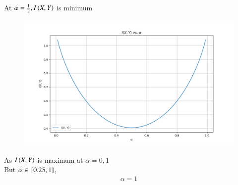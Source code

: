 \documentclass[article]{IEEEtran}
\theoremstyle{remark}
\begin{document}
At $\alpha = \frac{1}{2}, I\left(X,Y\right)$ is minimum\\
\begin{figure}[!ht]
\centering
\includegraphics[width=\columnwidth]{./figs/figure2.png}
\label{Fig:2}
\end{figure}
As $I\left(X,Y\right)$ is maximum at $\alpha = 0,1$\\
But $\alpha \in {}\left[0.25,1\right]$, 
\begin{align}
\alpha = 1
\end{align}
\end{document}
